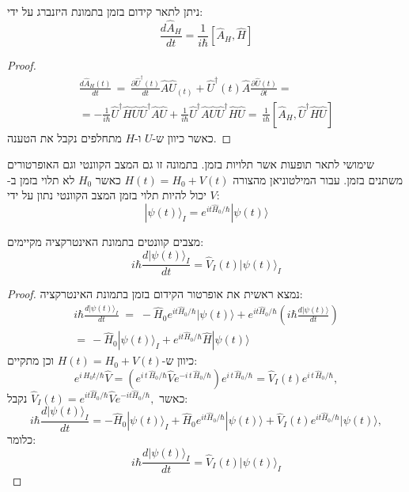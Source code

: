 \documentclass{tstextbook}
\begin{document}
\begin{proposition}
ניתן לתאר קידום בזמן בתמונת היזנברג על ידי:
$$\frac{d\hat{A}_{H}}{d t}=\frac{1}{i\hbar}\left[\hat{A}_{H},\hat{H}\right]$$

\end{proposition}
\begin{proof}
\begin{gather*}\frac{d\hat{A}_{H}(t)}{d t}\,=\,\frac{\partial\hat{U}^{\dagger}(t)}{d t}\hat{A}\hat{U}_{(t)}+\hat{U}^{\dagger}(t)\hat{A}\frac{\partial\hat{U}(t)}{\partial t}=\\=-\frac{1}{i\hbar}\hat{U}^{\dagger}\hat{H}\hat{U}\hat{U}^{\dagger}\hat{A}\hat{U}+\frac{1}{i\hbar}\hat{U}^{\dagger}\hat{A}\hat{U}\hat{U}^{\dagger}\hat{H}\hat{U}=\,\frac{1}{i\hbar}\left[\hat{A}_{H},\hat{U}^{\dagger}\hat{H}\hat{U}\right] 
\end{gather*}
כאשר כיוון ש-\(U\) ו-\(H\) מתחלפים נקבל את הטענה.

\end{proof}
\begin{definition}
שימושי לתאר תופעות אשר תלויות בזמן. בתמונה זו גם המצב הקוונטי וגם האופרטורים משתנים בזמן. עבור המילטוניאן מהצורה \(H(t)=H_{0}+V(t)\) כאשר \(H_{0}\) לא תלוי בזמן ב-\(V\) יכול להיות תלוי בזמן המצב הקוונטי נתון על ידי:
$$|\psi(t)\rangle_{I}=e^{i t\hat{H}_{0}/\hbar}|\psi(t)\rangle$$

\end{definition}
\begin{proposition}
מצבים קוונטים בתמונת האינטרקציה מקיימים:
$$i\hbar\frac{d|\psi(t)\rangle_{I}}{d t}=\hat{V}_{I}(t)|\psi(t)\rangle_{I}$$

\end{proposition}
\begin{proof}
נמצא ראשית את אופרטור הקידום בזמן בתמונת האינטרקציה:
\begin{gather*}i\hbar\frac{d|\psi(t)\rangle_{I}}{d t}\;=\;-\hat{H}_{0}e^{i t\hat{H}_{0}/\hbar}|\psi(t)\rangle+e^{i t\hat{H}_{0}/\hbar}\left(i\hbar\frac{d|\psi(t)\rangle}{d t}\right)\\=\,-\hat{H}_{0}|\psi(t)\rangle_{I}+e^{i t\hat{H}_{0}/\hbar}\hat{H}|\psi(t)\rangle 
\end{gather*}
כיוון ש-\(H(t)=H_{0}+V(t)\) וכן מתקיים:
$$e^{i\,H_{0}t/\hbar}\hat{V}=\left(e^{i\,t\,\hat{H}_{0}/\hbar}\hat{V}e^{-i\,t\,\hat{H}_{0}/\hbar}\right)e^{i\,t\,\hat{H}_{0}/\hbar}=\hat{V}_{I}(t)e^{i\,t\,\hat{H}_{0}/\hbar},$$
כאשר \(\hat{V}_{I}(t)=e^{i t\hat{H}_{0}/\hbar}\hat{V}e^{-i t\hat{H}_{0}/\hbar},\) נקבל:
$$i\hbar\frac{d|\psi(t)\rangle_{I}}{d t}=-\hat{H}_{0}|\psi(t)\rangle_{I}+\hat{H}_{0}e^{i t\hat{H}_{0}/\hbar}|\psi(t)\rangle+\hat{V}_{I}(t)e^{i t\hat{H}_{0}/\hbar}|\psi(t)\rangle,$$
כלומר:
$$i\hbar\frac{d|\psi(t)\rangle_{I}}{d t}=\hat{V}_{I}(t)|\psi(t)\rangle_{I}$$

\end{proof}
\end{document}
